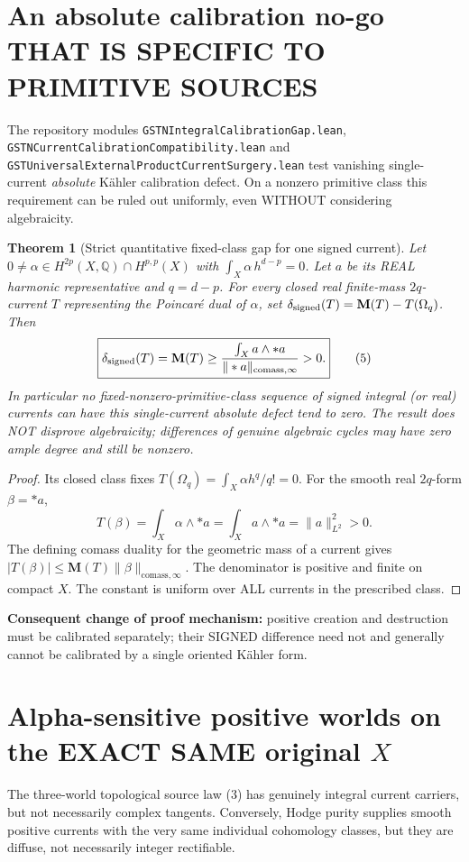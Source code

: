 \documentclass[11pt]{article}
\newtheorem{theorem}{Theorem}[section]
\newcommand{\Q}{\mathbb Q}
\newcommand{\Mass}{\mathbf M}
\begin{document}
\section{An absolute calibration no-go THAT IS SPECIFIC TO PRIMITIVE SOURCES}
The repository modules \texttt{GSTNIntegralCalibrationGap.lean},
\texttt{GSTNCurrentCalibrationCompatibility.lean} and
\texttt{GSTUniversalExternalProductCurrentSurgery.lean} test vanishing
single-current \emph{absolute} K\"ahler calibration defect. On a nonzero primitive class this requirement can be ruled out uniformly, even WITHOUT considering algebraicity.

\begin{theorem}[Strict quantitative fixed-class gap for one signed current]
Let \(0\ne\alpha\in H^{2p}(X,\Q)\cap H^{p,p}(X)\) with
\(\int_X\alpha\,h^{d-p}=0\). Let \(a\) be its REAL harmonic representative and \(q=d-p\). For every closed real finite-mass \(2q\)-current \(T\) representing the Poincar\'e dual of \(\alpha\), set
\(\delta_{\rm signed}(T)=\Mass(T)-T(\Omega_q)\).
Then
\[
\boxed{\delta_{\rm signed}(T)=\Mass(T)\ge
\frac{\int_Xa\wedge *a}{\|*a\|_{\mathrm{comass},\infty}}>0.}   \tag{5}
\]
In particular no fixed-nonzero-primitive-class sequence of \emph{signed} integral (or real) currents can have this single-current absolute defect tend to zero. The result does NOT disprove algebraicity; differences of genuine algebraic cycles may have zero ample degree and still be nonzero.
\end{theorem}
\begin{proof}
Its closed class fixes \(T(\Omega_q)=\int_X\alpha h^q/q!=0\).
For the smooth real \(2q\)-form \(\beta=*a\),
\[
T(\beta)=\int_X\alpha\wedge *a=\int_X a\wedge *a=\|a\|_{L^2}^2>0.
\]
The defining comass duality for the geometric mass of a current gives
\(|T(\beta)|\le\Mass(T)\|\beta\|_{\mathrm{comass},\infty}\).
The denominator is positive and finite on compact \(X\). The constant is uniform over ALL currents in the prescribed class.
\end{proof}
\noindent\textbf{Consequent change of proof mechanism:} positive creation and destruction must be calibrated separately; their SIGNED difference need not and generally cannot be calibrated by a single oriented K\"ahler form.

\section{Alpha-sensitive positive worlds on the EXACT SAME original \(X\)}
The three-world topological source law (3) has genuinely integral current carriers, but not necessarily complex tangents. Conversely, Hodge purity supplies smooth positive currents with the very same individual cohomology classes, but they are diffuse, not necessarily integer rectifiable.
\end{document}
